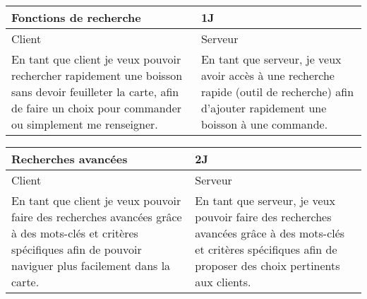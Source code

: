 \begin{center}
	\begin{tabular}{lll}
		\hline
			\multicolumn{2}{|p{14cm}}{Fonctions de recherche} & \multicolumn{1}{|p{0.7cm}|}{1J}\\
		\hline
			\multicolumn{1}{|p{7cm}}{Client} & \multicolumn{2}{|p{7cm}|}{Serveur}\\ 
		\hline
			\multicolumn{1}{|p{7cm}}{En tant que client je veux pouvoir rechercher
			rapidement une boisson sans devoir feuilleter la carte, afin de faire
			un choix pour commander ou simplement me renseigner.} 
			& \multicolumn{2}{|p{7cm}|}{En tant que serveur, je veux avoir accès 
			à une recherche rapide (outil de recherche) afin d'ajouter rapidement 
			une boisson à une commande.}\\ 
		\hline
	\end{tabular}

	\vspace{1cm}
	
	\begin{tabular}{lll}
		\hline
			\multicolumn{2}{|p{14cm}}{Recherches avancées} & \multicolumn{1}{|p{0.7cm}|}{2J} \\
		\hline
			\multicolumn{1}{|p{7cm}}{Client} & \multicolumn{2}{|p{7cm}|}{Serveur} \\ 
		\hline
			\multicolumn{1}{|p{7cm}}{En tant que client je veux pouvoir faire des
			recherches avancées grâce à des mots-clés et critères spécifiques afin de
			pouvoir naviguer plus facilement dans la carte.} 
			& \multicolumn{2}{|p{7cm}|}{En tant que serveur, je veux pouvoir faire
			des recherches avancées grâce à des mots-clés et critères spécifiques afin
			de proposer des choix pertinents aux clients.} \\ 
		\hline
	\end{tabular}
\end{center}

